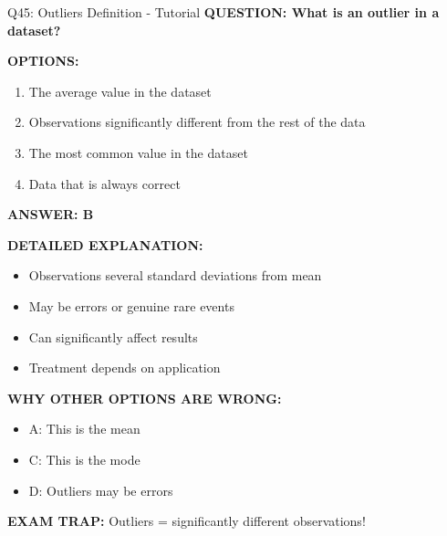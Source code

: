 \documentclass[8pt]{beamer}
\begin{document}
	\begin{frame}{Q45: Outliers Definition - Tutorial}
		\fontsize{6.5}{7.5}\selectfont
		\textbf{QUESTION: What is an outlier in a dataset?}
		
		\vspace{0.1cm}
		\textbf{OPTIONS:}
		\begin{enumerate}
			\item The average value in the dataset
			\item Observations significantly different from the rest of the data
			\item The most common value in the dataset
			\item Data that is always correct
		\end{enumerate}
		
		\vspace{0.1cm}
		\textcolor{myblue}{\textbf{ANSWER: B}}
		
		\vspace{0.1cm}
		\textbf{DETAILED EXPLANATION:}
		\begin{itemize}
			\item Observations several standard deviations from mean
			\item May be errors or genuine rare events
			\item Can significantly affect results
			\item Treatment depends on application
		\end{itemize}
		
		\vspace{0.1cm}
		\textcolor{myred}{\textbf{WHY OTHER OPTIONS ARE WRONG:}}
		\begin{itemize}
			\item \textcolor{myred}{A:} This is the mean
			\item \textcolor{myred}{C:} This is the mode
			\item \textcolor{myred}{D:} Outliers may be errors
		\end{itemize}
		
		\textcolor{myred}{\textbf{EXAM TRAP:}} Outliers = \textcolor{myblue}{significantly different observations}!
	\end{frame}
	
\end{document}
